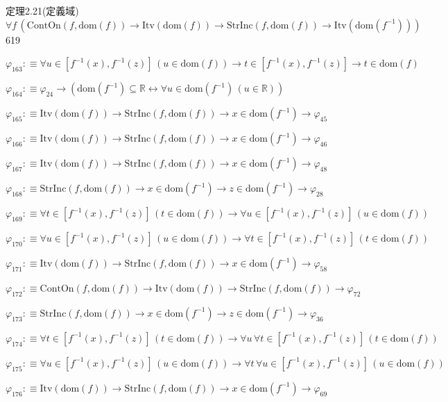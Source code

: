 \begin{fullproof}{定理2.21(定義域)}{$\forall f\,(\mathrm{ContOn}(f,\mathrm{dom}(f)) \to \mathrm{Itv}(\mathrm{dom}(f)) \to \mathrm{StrInc}(f,\mathrm{dom}(f)) \to \mathrm{Itv}(\mathrm{dom}(f^{-1})))$}{619}
\begin{abbrevlist}
\item $\varphi_{163} :\equiv \forall u \in [f^{-1}(x),f^{-1}(z)]\,(u \in \mathrm{dom}(f)) \to t \in [f^{-1}(x),f^{-1}(z)] \to t \in \mathrm{dom}(f)$
\item $\varphi_{164} :\equiv \varphi_{24} \to (\mathrm{dom}(f^{-1}) \subseteq \mathbb{R} \leftrightarrow \forall u \in \mathrm{dom}(f^{-1})\,(u \in \mathbb{R}))$
\item $\varphi_{165} :\equiv \mathrm{Itv}(\mathrm{dom}(f)) \to \mathrm{StrInc}(f,\mathrm{dom}(f)) \to x \in \mathrm{dom}(f^{-1}) \to \varphi_{45}$
\item $\varphi_{166} :\equiv \mathrm{Itv}(\mathrm{dom}(f)) \to \mathrm{StrInc}(f,\mathrm{dom}(f)) \to x \in \mathrm{dom}(f^{-1}) \to \varphi_{46}$
\item $\varphi_{167} :\equiv \mathrm{Itv}(\mathrm{dom}(f)) \to \mathrm{StrInc}(f,\mathrm{dom}(f)) \to x \in \mathrm{dom}(f^{-1}) \to \varphi_{48}$
\item $\varphi_{168} :\equiv \mathrm{StrInc}(f,\mathrm{dom}(f)) \to x \in \mathrm{dom}(f^{-1}) \to z \in \mathrm{dom}(f^{-1}) \to \varphi_{28}$
\item $\varphi_{169} :\equiv \forall t \in [f^{-1}(x),f^{-1}(z)]\,(t \in \mathrm{dom}(f)) \to \forall u \in [f^{-1}(x),f^{-1}(z)]\,(u \in \mathrm{dom}(f))$
\item $\varphi_{170} :\equiv \forall u \in [f^{-1}(x),f^{-1}(z)]\,(u \in \mathrm{dom}(f)) \to \forall t \in [f^{-1}(x),f^{-1}(z)]\,(t \in \mathrm{dom}(f))$
\item $\varphi_{171} :\equiv \mathrm{Itv}(\mathrm{dom}(f)) \to \mathrm{StrInc}(f,\mathrm{dom}(f)) \to x \in \mathrm{dom}(f^{-1}) \to \varphi_{58}$
\item $\varphi_{172} :\equiv \mathrm{ContOn}(f,\mathrm{dom}(f)) \to \mathrm{Itv}(\mathrm{dom}(f)) \to \mathrm{StrInc}(f,\mathrm{dom}(f)) \to \varphi_{72}$
\item $\varphi_{173} :\equiv \mathrm{StrInc}(f,\mathrm{dom}(f)) \to x \in \mathrm{dom}(f^{-1}) \to z \in \mathrm{dom}(f^{-1}) \to \varphi_{36}$
\item $\varphi_{174} :\equiv \forall t \in [f^{-1}(x),f^{-1}(z)]\,(t \in \mathrm{dom}(f)) \to \forall u\,\forall t \in [f^{-1}(x),f^{-1}(z)]\,(t \in \mathrm{dom}(f))$
\item $\varphi_{175} :\equiv \forall u \in [f^{-1}(x),f^{-1}(z)]\,(u \in \mathrm{dom}(f)) \to \forall t\,\forall u \in [f^{-1}(x),f^{-1}(z)]\,(u \in \mathrm{dom}(f))$
\item $\varphi_{176} :\equiv \mathrm{Itv}(\mathrm{dom}(f)) \to \mathrm{StrInc}(f,\mathrm{dom}(f)) \to x \in \mathrm{dom}(f^{-1}) \to \varphi_{69}$

\end{abbrevlist}
\end{fullproof}
